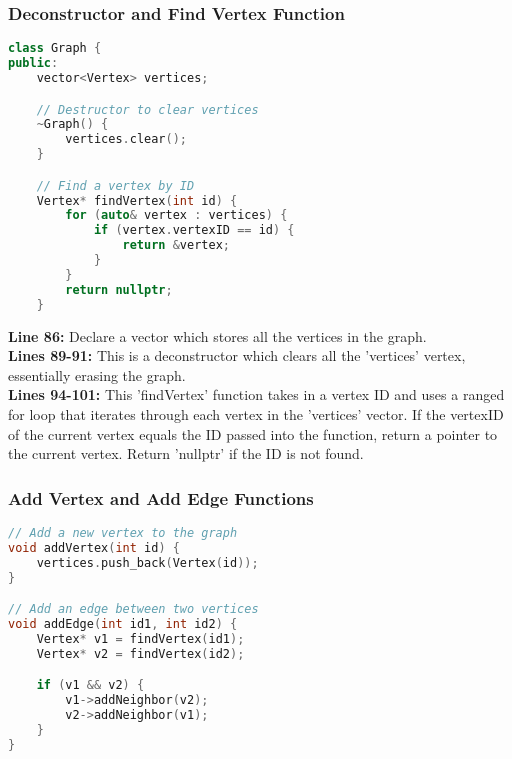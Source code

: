 \documentclass[letterpaper, 10pt,DIV=13]{scrartcl}
\numberwithin{equation}{section} %
\numberwithin{figure}{section} %
\numberwithin{table}{section} %
\begin{document}
\subsubsection{Deconstructor and Find Vertex Function}
\begin{linenumbers}
\begin{lstlisting}[language=C++, caption={Deconstructor and Find Vertex Function}, label={code:example}]
class Graph {
public:
    vector<Vertex> vertices;

    // Destructor to clear vertices
    ~Graph() {
        vertices.clear();
    }

    // Find a vertex by ID
    Vertex* findVertex(int id) {
        for (auto& vertex : vertices) {
            if (vertex.vertexID == id) {
                return &vertex;
            }
        }
        return nullptr;
    }
\end{lstlisting}
\end{linenumbers}
\nolinenumbers

\textbf{Line 86:}  Declare a vector which stores all the vertices in the graph. \\
\textbf{Lines 89-91:} This is a deconstructor which clears all the 'vertices' vertex, essentially erasing the graph. \\
\textbf{Lines 94-101:} This 'findVertex' function takes in a vertex ID and uses a ranged for loop that iterates through each vertex in the 'vertices' vector. If the vertexID of the current vertex equals the ID passed into the function, return a pointer to the current vertex. Return 'nullptr' if the ID is not found.



\subsubsection{Add Vertex and Add Edge Functions}
\begin{linenumbers}
\begin{lstlisting}[language=C++, caption={Add Vertex and Add Edge Functions}, label={code:example}]
// Add a new vertex to the graph
void addVertex(int id) {
    vertices.push_back(Vertex(id));
}

// Add an edge between two vertices
void addEdge(int id1, int id2) {
    Vertex* v1 = findVertex(id1);
    Vertex* v2 = findVertex(id2);

    if (v1 && v2) {
        v1->addNeighbor(v2);
        v2->addNeighbor(v1);
    }
}

\end{lstlisting}
\end{linenumbers}
\nolinenumbers
\end{document}
